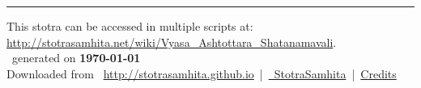 \documentclass[oneside,12pt]{book}
\begin{document}
\setmainfont[Script=Devanagari,Mapping=tex-text]{Sanskrit 2003}
\fontsize {16}{19.25}\selectfont
\begin{center}

\end{center}
\vfill
\centering
\rule{0.8\textwidth}{0.6pt}

\footnotesize
{}\sffamily
This stotra can be accessed in multiple scripts at:\\
\url{http://stotrasamhita.net/wiki/Vyasa_Ashtottara_Shatanamavali}.\\[1ex]
\faFilePdfO~generated on \textbf{\today}\\[1ex]
Downloaded from \faGlobe{}~\url{http://stotrasamhita.github.io}~|~\href{https://github.com/StotraSamhita}{\faGithubSquare{}~StotraSamhita}~|~\href{https://stotrasamhita.github.io/about/}{Credits}
\end{document}
